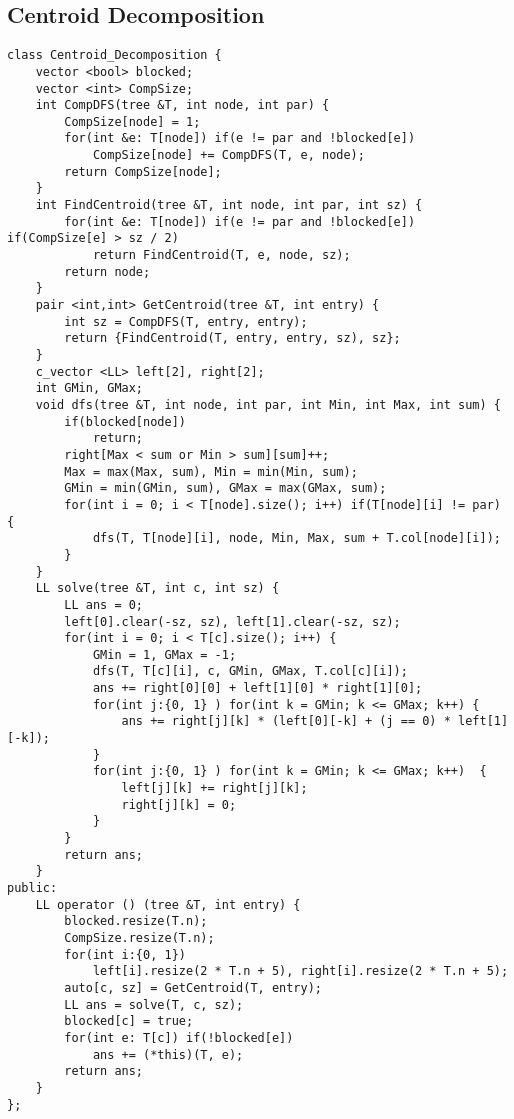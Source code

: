 \documentclass[FSZ,a4paper,onesided]{article}
\begin{document}
\begin{multicols*}{\COLS}
\subsection{Centroid Decomposition}
\begin{lstlisting}
class Centroid_Decomposition {
    vector <bool> blocked;
    vector <int> CompSize;
    int CompDFS(tree &T, int node, int par) {
        CompSize[node] = 1;
        for(int &e: T[node]) if(e != par and !blocked[e])
            CompSize[node] += CompDFS(T, e, node);
        return CompSize[node];
    }
    int FindCentroid(tree &T, int node, int par, int sz) {
        for(int &e: T[node]) if(e != par and !blocked[e]) if(CompSize[e] > sz / 2)
            return FindCentroid(T, e, node, sz);
        return node;
    }
    pair <int,int> GetCentroid(tree &T, int entry) {
        int sz = CompDFS(T, entry, entry);
        return {FindCentroid(T, entry, entry, sz), sz};
    }
    c_vector <LL> left[2], right[2]; 
    int GMin, GMax;
    void dfs(tree &T, int node, int par, int Min, int Max, int sum) {
        if(blocked[node])
            return;
        right[Max < sum or Min > sum][sum]++;
        Max = max(Max, sum), Min = min(Min, sum);
        GMin = min(GMin, sum), GMax = max(GMax, sum);
        for(int i = 0; i < T[node].size(); i++) if(T[node][i] != par) {
            dfs(T, T[node][i], node, Min, Max, sum + T.col[node][i]);
        }
    }
    LL solve(tree &T, int c, int sz) {
        LL ans = 0;
        left[0].clear(-sz, sz), left[1].clear(-sz, sz);
        for(int i = 0; i < T[c].size(); i++) {
            GMin = 1, GMax = -1;
            dfs(T, T[c][i], c, GMin, GMax, T.col[c][i]);
            ans += right[0][0] + left[1][0] * right[1][0];
            for(int j:{0, 1} ) for(int k = GMin; k <= GMax; k++) {
                ans += right[j][k] * (left[0][-k] + (j == 0) * left[1][-k]);
            }
            for(int j:{0, 1} ) for(int k = GMin; k <= GMax; k++)  {
                left[j][k] += right[j][k];
                right[j][k] = 0;
            }
        }
        return ans;
    }
public:
    LL operator () (tree &T, int entry) {
        blocked.resize(T.n);
        CompSize.resize(T.n);
        for(int i:{0, 1})
            left[i].resize(2 * T.n + 5), right[i].resize(2 * T.n + 5);
        auto[c, sz] = GetCentroid(T, entry);
        LL ans = solve(T, c, sz);
        blocked[c] = true;
        for(int e: T[c]) if(!blocked[e])
            ans += (*this)(T, e);
        return ans;
    }   
};\end{lstlisting}

\end{multicols*}
\end{document}
